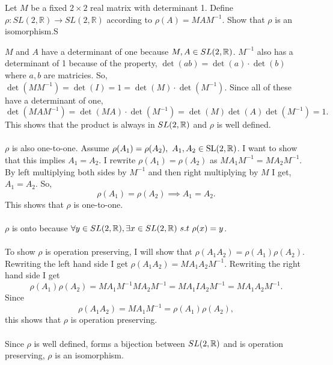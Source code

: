 \documentclass[titlepage]{article}
\begin{document}
 
\fancyhf{}
\cfoot{\thepage}

\begin{problem}{1}
Let $M$ be a fixed $2\times2$ real matrix with determinant 1. Define $\rho: SL(2,\mathbb{R}) \rightarrow SL(2,\mathbb{R})$ according to $\rho(A) = MAM^{-1}$. Show that $\rho$ is an isomorphism.S
\end{problem}
\begin{solution}
$M$ and $A$ have a determinant of one because $M,A \in SL(2,\mathbb{R})$. $M^{-1}$ also has a determinant of 1 because of the property, $\det(ab) = \det(a)\cdot \det(b)$ where $a,b$ are matricies. So, $\det(MM^{-1}) = \det(I) = 1 = \det(M)\cdot\det(M^{-1})$. Since all of these have a determinant of one, $\det(MAM^{-1}) = \det(MA)\cdot\det(M^{-1})=\det(M)\det(A)\det(M^{-1}) = 1.$ This shows that the product is always in $SL(2,\mathbb{R})$ and $\rho$ is well defined.
\\ \\
$\rho$ is also one-to-one. Assume $\rho(A_1) = \rho(A_2),\ A_1,A_2 \in \text{SL}(2,\mathbb{R})$. I want to show that this implies $A_1 = A_2$. I rewrite $\rho(A_1) = \rho(A_2)$ as $MA_1M^{-1} = MA_2M^{-1}$. By left multiplying both sides by $M^{-1}$ and then right multiplying by $M$ I get, $A_1 =A_2$. So, 
$$\rho(A_1) = \rho(A_2) \implies A_1 = A_2.$$
This shows that $\rho$ is one-to-one.
\\ \\
$\rho$ is onto because $\forall y \in SL(2,\mathbb{R}), \exists x \in SL(2,\mathbb{R}) \ s.t \ \rho(x)=y$. 
\\ \\
To show $\rho$ is operation preserving, I will show that $\rho(A_1 A_2) = \rho(A_1) \rho(A_2).$ Rewriting the left hand side I get $\rho(A_1 A_2) =MA_1A_2M^{-1}.$ Rewriting the right hand side I get 
$$\rho(A_1) \rho(A_2) = MA_1M^{-1} MA_2M^{-1} = MA_1IA_2M^{-1} = MA_1A_2M^{-1}.$$
Since 
$$\rho(A_1 A_2) = MA_1M^{-1} = \rho(A_1) \rho(A_2),$$
this shows that $\rho$ is operation preserving.
\\ \\
Since $\rho$ is well defined, forms a bijection between $SL(2,\mathbb{R})$ and is operation preserving, $\rho$ is an isomorphism.
\end{solution}
\end{document}

